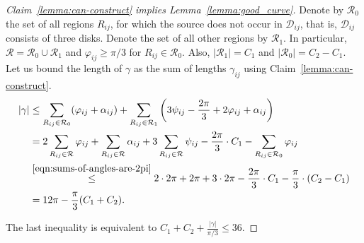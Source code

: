 \begin{proof}[Claim~\ref{lemma:can-construct} implies Lemma~\ref{lemma:good_curve}]


%
Denote by $\mathcal{R}_0$ the set of all regions $R_{ij}$, for which the source does not occur in $\mathcal{D}_{ij}$, that is, $\mathcal{D}_{ij}$ consists of three disks. Denote the set of all other regions by $\mathcal{R}_1$. In particular, $\mathcal{R} = \mathcal{R}_0\cup\mathcal{R}_1$ and $\varphi_{ij}\geq\pi/3$ for $R_{ij}\in\mathcal{R}_0$. Also, $|\mathcal{R}_1| = C_1$ and $|\mathcal{R}_0| = C_2 - C_1$.
Let us bound the length of $\gamma$ as the sum of lengths $\gamma_{ij}$ using Claim~\ref{lemma:can-construct}.
%
\begin{align*}
    |\gamma| &\leq \sum_{R_{ij}\in\mathcal{R}_0}(\varphi_{ij} + \alpha_{ij}) + \sum_{R_{ij}\in\mathcal{R}_1}\left(3\psi_{ij} - \frac{2\pi}{3} + 2\varphi_{ij} + \alpha_{ij}\right)  \\
    &= 2\sum_{R_{ij}\in\mathcal{R}}\varphi_{ij} + \sum_{R_{ij}\in\mathcal{R}}\alpha_{ij} + 3\sum_{R_{ij}\in\mathcal{R}}\psi_{ij} - \frac{2\pi}{3}\cdot C_1 - \sum_{R_{ij}\in\mathcal{R}_0}\varphi_{ij}  \\
    &\stackrel{\eqref{eqn:sums-of-angles-are-2pi}}{\leq} 2\cdot 2\pi + 2\pi + 3\cdot 2\pi - \frac{2\pi}{3}\cdot C_1 - \frac{\pi}{3}\cdot (C_2 - C_1)  \\
    &= 12\pi - \frac{\pi}{3}(C_1 + C_2).
\end{align*}

The last inequality is equivalent to $C_1 + C_2 + \frac{|\gamma|}{\pi/3}\leq 36$.
\end{proof}

